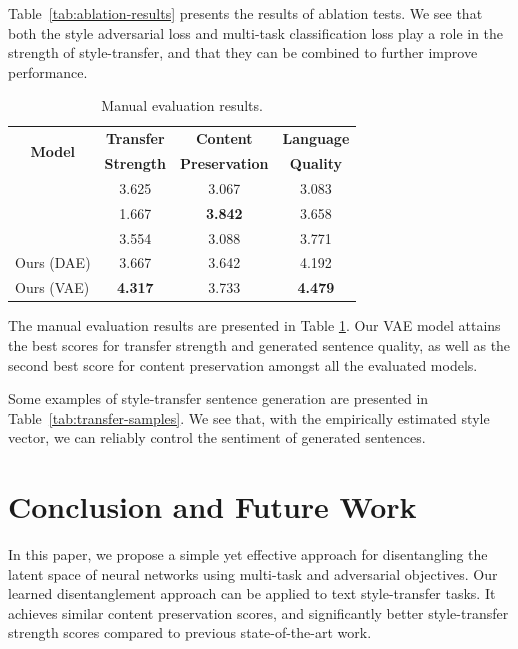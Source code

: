 \documentclass[letterpaper]{article} %
\newcommand{\tabh}[1]{\multicolumn{1}{c|}{\textbf{#1}}}
\newcommand{\tabc}[2]{\multicolumn{1}{|c||}{\multirow{#1}{*}{\textbf{#2}}}}
\begin{document}
Table~\ref{tab:ablation-results} presents the results of ablation tests.
We see that both the style adversarial loss and multi-task classification loss play a role in the strength of style-transfer, and that they can be combined to further improve performance.

\begin{table}[ht]
	\centering
	\begin{tabular}{| l || c | c | c | }
		\hline
		\tabc{2}{Model}                    & \tabh{Transfer} & \tabh{Content}      & \tabh{Language} \\
		                                   & \tabh{Strength} & \tabh{Preservation} & \tabh{Quality}  \\
		\hline
		\hline
		\citeauthor{shen2017style}         & 3.625           & 3.067               & 3.083           \\
		\hline
		\citeauthor{fu2018style}           & 1.667           & \textbf{3.842}      & 3.658           \\
		\hline
		\citeauthor{zhao2018adversarially} & 3.554           & 3.088               & 3.771           \\
		\hline
		Ours (DAE)                         & 3.667           & 3.642               & 4.192           \\
		\hline
		Ours (VAE)                         & \textbf{4.317}  & 3.733               & \textbf{4.479}  \\
		\hline
	\end{tabular}
	\caption{Manual evaluation results.}
	\label{tab:manual-evaluation}
\end{table}

The manual evaluation results are presented in Table \ref{tab:manual-evaluation}.
Our VAE model attains the best scores for transfer strength and generated sentence quality, as well as the second best score for content preservation amongst all the evaluated models.

Some examples of style-transfer sentence generation are presented in Table~\ref{tab:transfer-samples}.
We see that, with the empirically estimated style vector, we can reliably control the sentiment of generated sentences.

\section{Conclusion and Future Work}
In this paper, we propose a simple yet effective approach for disentangling the latent space of neural networks using multi-task and adversarial objectives.
Our learned disentanglement approach can be applied to text style-transfer tasks.
It achieves similar content preservation scores, and significantly better style-transfer strength scores compared to previous state-of-the-art work.
\end{document}
